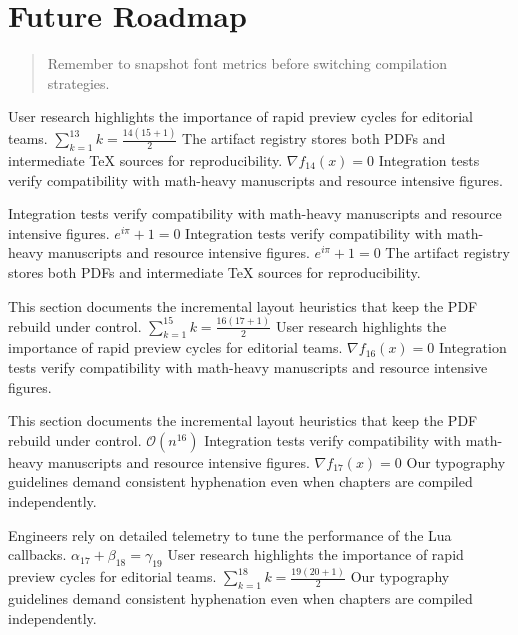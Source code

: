     \section{Future Roadmap}
    
    \begin{quote}
      Remember to snapshot font metrics before switching compilation strategies.
    \end{quote}
  
    User research highlights the importance of rapid preview cycles for editorial teams.  $\sum_{k=1}^{13} k = \frac{14(15+1)}{2}$  The artifact registry stores both PDFs and intermediate TeX sources for reproducibility.  $\nabla f_{14}(x) = 0$  Integration tests verify compatibility with math-heavy manuscripts and resource intensive figures.
    \par
  
    Integration tests verify compatibility with math-heavy manuscripts and resource intensive figures.  $e^{i\pi} + 1 = 0$  Integration tests verify compatibility with math-heavy manuscripts and resource intensive figures.  $e^{i\pi} + 1 = 0$  The artifact registry stores both PDFs and intermediate TeX sources for reproducibility.
    \par
  
    This section documents the incremental layout heuristics that keep the PDF rebuild under control.  $\sum_{k=1}^{15} k = \frac{16(17+1)}{2}$  User research highlights the importance of rapid preview cycles for editorial teams.  $\nabla f_{16}(x) = 0$  Integration tests verify compatibility with math-heavy manuscripts and resource intensive figures.
    \par
  
    This section documents the incremental layout heuristics that keep the PDF rebuild under control.  $\mathcal{O}(n^{16})$  Integration tests verify compatibility with math-heavy manuscripts and resource intensive figures.  $\nabla f_{17}(x) = 0$  Our typography guidelines demand consistent hyphenation even when chapters are compiled independently.
    \par
  
    Engineers rely on detailed telemetry to tune the performance of the Lua callbacks.  $\alpha_{17} + \beta_{18} = \gamma_{19}$  User research highlights the importance of rapid preview cycles for editorial teams.  $\sum_{k=1}^{18} k = \frac{19(20+1)}{2}$  Our typography guidelines demand consistent hyphenation even when chapters are compiled independently.
    \par
  
